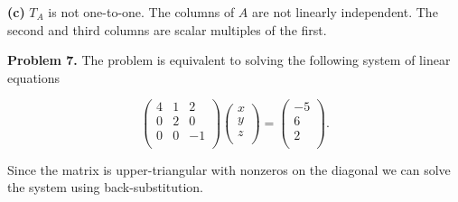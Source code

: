 \documentclass[oneside,12pt]{amsart}
\begin{document}
\bigskip

\textbf{(c)} $T_A$ is not one-to-one. The columns of $A$ are not linearly
independent. The second and third columns are scalar multiples of the first.

\bigskip

\textbf{Problem 7.} The problem is equivalent to solving the following
system of linear equations

$$
\begin{pmatrix}
4 & 1 & 2 \\
0 & 2 & 0 \\
0 & 0 & -1 \\
\end{pmatrix}
\begin{pmatrix}
x \\
y \\
z \\
\end{pmatrix}
=
\begin{pmatrix}
-5 \\
6 \\
2 \\
\end{pmatrix}
.
$$

Since the matrix is upper-triangular with nonzeros on the diagonal we can
solve the system using back-substitution.
\end{document}
